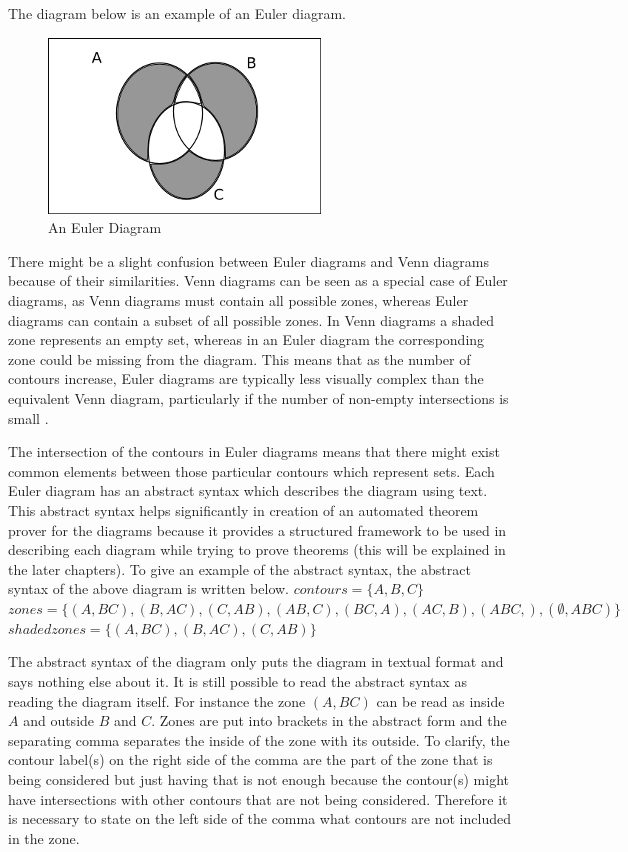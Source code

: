 \documentclass[10pt, a4paper, titlepage]{article}
\begin{document}
The diagram below is an example of an Euler diagram.

\begin{figure}[h]
\centering
\includegraphics{images/dia2.png}
\caption{An Euler Diagram}
\end{figure}

There might be a slight confusion between Euler diagrams and Venn diagrams because of their similarities. Venn diagrams can be seen as a special case of Euler diagrams, as Venn diagrams must contain all possible zones, whereas Euler diagrams can contain a subset of all possible zones. In Venn diagrams a shaded zone represents an empty set, whereas in an Euler diagram the corresponding zone could be missing from the diagram. This means that as the number of contours increase, Euler diagrams are typically less visually complex than the equivalent Venn diagram, particularly if the number of non-empty intersections is small \cite{Kent_Euler}.

The intersection of the contours in Euler diagrams means that there might exist common elements between those particular contours which represent sets. Each Euler diagram has an abstract syntax which describes the diagram using text. This abstract syntax helps significantly in creation of an automated theorem prover for the diagrams because it provides a structured framework to be used in describing each diagram while trying to prove theorems (this will be explained in the later chapters). To give an example of the abstract syntax, the abstract syntax of the above diagram is written below.
\newline \newline
$contours =  \lbrace A, B, C \rbrace $ \newline
$zones = \lbrace (A , BC) , (B , AC), (C, AB), (AB , C) , (BC , A) , (AC, B), (ABC , ), ( \emptyset  , ABC) \rbrace  $ \newline 
$shaded zones = \lbrace (A , BC), (B , AC) , (C, AB) \rbrace  $ \newline

The abstract syntax of the diagram only puts the diagram in textual format and says nothing else about it. It is still possible to read the abstract syntax as reading the diagram itself. For instance the zone $(A, BC)$ can be read as inside $A$ and outside $B$ and $C$. Zones are put into brackets in the abstract form and the separating comma separates the inside of the zone with its outside. To clarify, the contour label(s) on the right side of the comma are the part of the zone that is being considered but just having that is not enough because the contour(s) might have intersections with other contours that are not being considered. Therefore it is necessary to state on the left side of the comma what contours are not included in the zone.
\end{document}
